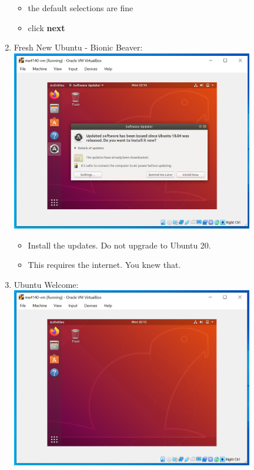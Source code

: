 \documentclass[12pt]{article}
\begin{document}
\begin{description}
\begin{description}
\begin{enumerate}
      		 \begin{itemize}      	
     		\item the default selections are fine
     		\item click {\bf next}
    		\end{itemize}
    		
    		\newpage
    		\item Fresh New Ubuntu - Bionic Beaver: \vspace{5mm} \\
      		\includegraphics[scale=.55]{Capture25.png}
      		 \begin{itemize}
        	\item Install the updates. Do not upgrade to Ubuntu 20.
        	\item This requires the internet. You knew that. 
    		\end{itemize} 
    		 \vspace{5mm} 
    		\item Ubuntu Welcome: \vspace{5mm} \\
      		\includegraphics[scale=.55]{Capture26.png}

\end{enumerate}
\end{description}
\end{description}
\end{document}
